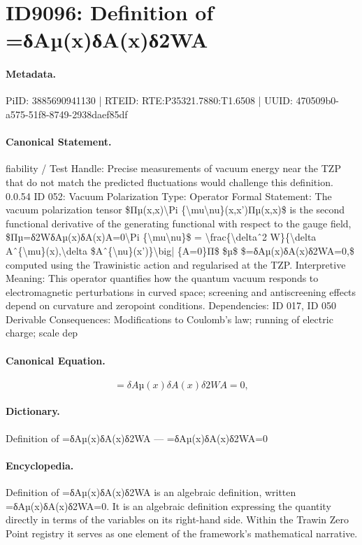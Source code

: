 \section*{ID9096: Definition of =δAµ(x)δA(x)δ2WA}
\paragraph{Metadata.}
PiID: 3885690941130 | RTEID: RTE:P35321.7880:T1.6508 | UUID: 470509b0-a575-51f8-8749-2938daef85df

\paragraph{Canonical Statement.}
fiability / Test Handle: Precise measurements of vacuum energy near the TZP that do not match the predicted fluctuations would challenge this definition. 0.0.54 ID 052: Vacuum Polarization Type: Operator Formal Statement: The vacuum polarization tensor \$Πµ(x,x)\textbackslash{}Pi \{\textbackslash{}mu\textbackslash{}nu\}(x,x’)Πµ(x,x)\$ is the second functional derivative of the generating functional with respect to the gauge field, \$Πµ=δ2WδAµ(x)δA(x)A=0\textbackslash{}Pi \{\textbackslash{}mu\textbackslash{}nu\}\$ = \textbackslash{}frac\{\textbackslash{}deltaˆ2 W\}\{\textbackslash{}delta Aˆ\{\textbackslash{}mu\}(x),\textbackslash{}delta \$Aˆ\{\textbackslash{}nu\}(x’)\}\textbackslash{}big| \{A=0\}Π\$ \$µ\$ \$=δAµ(x)δA(x)δ2WA=0,\$ computed using the Trawinistic action and regularised at the TZP. Interpretive Meaning: This operator quantifies how the quantum vacuum responds to electromagnetic perturbations in curved space; screening and antiscreening effects depend on curvature and zeropoint conditions. Dependencies: ID 017, ID 050 Derivable Consequences: Modifications to Coulomb’s law; running of electric charge; scale dep

\paragraph{Canonical Equation.}
\[
=δAµ(x)δA(x)δ2WA=0,
\]

\paragraph{Dictionary.}
Definition of =δAµ(x)δA(x)δ2WA — =δAµ(x)δA(x)δ2WA=0

\paragraph{Encyclopedia.}
Definition of =δAµ(x)δA(x)δ2WA is an algebraic definition, written =δAµ(x)δA(x)δ2WA=0. It is an algebraic definition expressing the quantity directly in terms of the variables on its right-hand side. Within the Trawin Zero Point registry it serves as one element of the framework's mathematical narrative.
